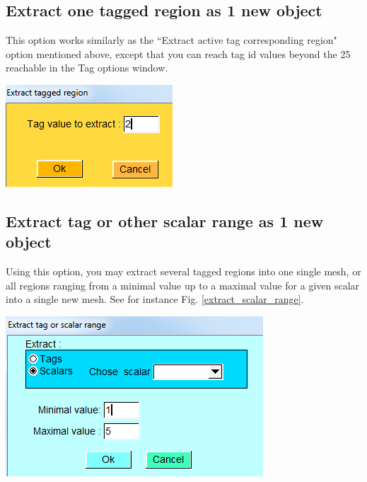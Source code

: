 \subsection{Extract one tagged region as 1 new object}
\noindent
\begin{minipage}{0.5\textwidth}
This option works similarly as the ``Extract active tag
corresponding region" option mentioned above, except that
you can reach tag id values beyond the 25 reachable in the
Tag options window.
\end{minipage}    
\begin{minipage}{0.5\textwidth}\centering
  \includegraphics[scale=0.5]{images/Tags/Extract_one_tagged_region.png}


 \end{minipage} 
\noindent



\subsection{Extract tag or other scalar range as 1 new object}
\noindent
\begin{minipage}{0.5\textwidth}
Using this option, you may extract several tagged regions
into one single mesh, or all regions ranging from a minimal
value up to a maximal value for a given scalar into a single
new mesh. See for instance Fig. \ref{extract_scalar_range}.
\end{minipage}    
\begin{minipage}{0.5\textwidth}\centering
  \includegraphics[scale=0.5]{images/Tags/Extract_scalar_range.png}
 \end{minipage} 
\noindent


